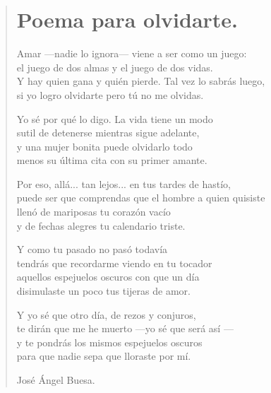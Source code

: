 \documentclass[11pt, portrait, twoside, notitlepage, openright]{book}
\begin{document}
\newpage
\begin{verse}
\begin{center}
\section{Poema para olvidarte.}
\end{center}
Amar —nadie lo ignora— viene a ser como un juego:\\
el juego de dos almas y el juego de dos vidas.\\
Y hay quien gana y quién pierde. Tal vez lo sabrás luego,\\
si yo logro olvidarte pero tú no me olvidas.
\newline

Yo sé por qué lo digo. La vida tiene un modo\\
sutil de detenerse mientras sigue adelante,\\
y una mujer bonita puede olvidarlo todo\\
menos su última cita con su primer amante.
\newline

Por eso, allá... tan lejos... en tus tardes de hastío,\\
puede ser que comprendas que el hombre a quien quisiste\\
llenó de mariposas tu corazón vacío\\
y de fechas alegres tu calendario triste.
\newline

Y como tu pasado no pasó todavía\\
tendrás que recordarme viendo en tu tocador\\
aquellos espejuelos oscuros con que un día\\
disimulaste un poco tus tijeras de amor.
\newpage

Y yo sé que otro día, de rezos y conjuros,\\
te dirán que me he muerto  —yo sé que será así —\\
y te pondrás los mismos espejuelos oscuros\\
para que nadie sepa que lloraste por mí.
\newline

José Ángel Buesa.
\end{verse}
\end{document}
